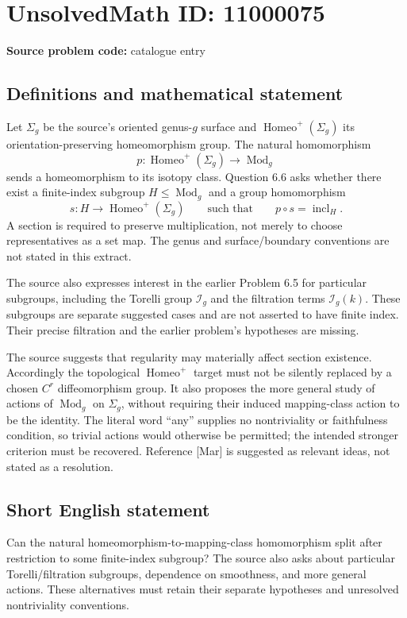 \documentclass[11pt]{article}
\begin{document}
\section*{UnsolvedMath ID: 11000075}
\textbf{Source problem code:} catalogue entry
\subsection{Definitions and mathematical statement}
Let \(\Sigma_g\) be the source's oriented genus-\(g\) surface and \(\operatorname{Homeo}^+(\Sigma_g)\) its orientation-preserving homeomorphism group. The natural homomorphism
\[
 p:\operatorname{Homeo}^+(\Sigma_g)\longrightarrow\operatorname{Mod}_g
\]
sends a homeomorphism to its isotopy class. Question 6.6 asks whether there exist a finite-index subgroup \(H\le\operatorname{Mod}_g\) and a group homomorphism
\[
 s:H\longrightarrow\operatorname{Homeo}^+(\Sigma_g)
 \qquad\text{such that}\qquad p\circ s=\operatorname{incl}_H.
\]
A section is required to preserve multiplication, not merely to choose representatives as a set map. The genus and surface/boundary conventions are not stated in this extract.

The source also expresses interest in the earlier Problem 6.5 for particular subgroups, including the Torelli group \(\mathcal I_g\) and the filtration terms \(\mathcal I_g(k)\). These subgroups are separate suggested cases and are not asserted to have finite index. Their precise filtration and the earlier problem's hypotheses are missing.

The source suggests that regularity may materially affect section existence. Accordingly the topological \(\operatorname{Homeo}^+\) target must not be silently replaced by a chosen \(C^r\) diffeomorphism group. It also proposes the more general study of actions of \(\operatorname{Mod}_g\) on \(\Sigma_g\), without requiring their induced mapping-class action to be the identity. The literal word ``any'' supplies no nontriviality or faithfulness condition, so trivial actions would otherwise be permitted; the intended stronger criterion must be recovered. Reference [Mar] is suggested as relevant ideas, not stated as a resolution.
\subsection{Short English statement}
Can the natural homeomorphism-to-mapping-class homomorphism split after restriction to some finite-index subgroup? The source also asks about particular Torelli/filtration subgroups, dependence on smoothness, and more general actions. These alternatives must retain their separate hypotheses and unresolved nontriviality conventions.
\end{document}
